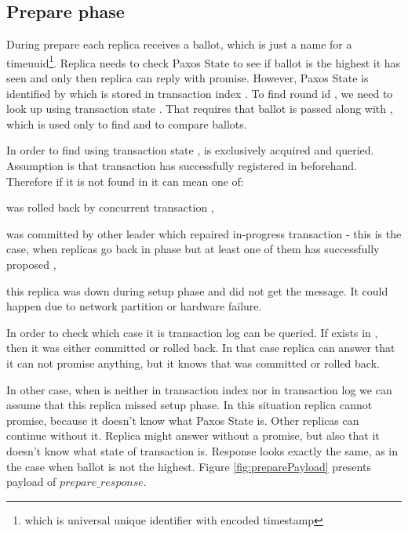 \subsection{Prepare phase}
During prepare each replica receives a ballot, which is just a name for a timeuuid\footnote{which is universal unique identifier with encoded timestamp}. Replica needs to check Paxos State to see if ballot is the highest it has seen and only then replica can reply with promise. However, Paxos State is identified by \paxosRoundId which is stored in transaction index \txIndex. To find \paxos round id \paxosRoundId, we need to look up \txIndex using transaction state \txState. That requires that ballot is passed along with \txState, which is used only to find \paxosRoundId and to compare ballots.

In order to find \paxosRoundId using transaction state \txState, \txIndex is exclusively acquired and queried. Assumption is that transaction \transaction has successfully registered in \txIndex beforehand. Therefore if it is not found in \txIndex it can mean one of:
\begin{enumerate*}[label=\alph*)]
\item \transaction was rolled back by concurrent transaction \transactionj,
\item \transaction was committed by other leader which repaired in-progress transaction - this is the case, when replicas go back in phase but at least one of them has successfully proposed \txState,
\item this replica was down during setup phase and did not get the message. It could happen due to network partition or hardware failure.
\end{enumerate*}


In order to check which case it is transaction log \txLog can be queried. If \txState exists in \txLog, then it was either committed or rolled back. In that case replica can answer that it can not promise anything, but it knows that \transaction was committed or rolled back.

In other case, when \txState is neither in transaction index \txIndex nor in transaction log \txLog we can assume that this replica missed setup phase. In this situation replica cannot promise, because it doesn’t know what Paxos State is. Other replicas can continue without it. Replica might answer without a promise, but also that it doesn’t know what state of transaction is. Response looks exactly the same, as in the case when ballot is not the highest.
Figure \ref{fig:preparePayload} presents payload of $\mathit{prepare\_response}$.

